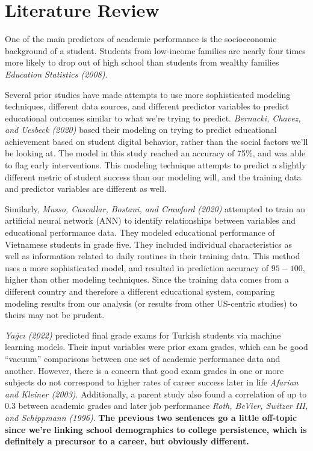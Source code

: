 \documentclass[
  man,floatsintext]{apa6}
\begin{document}
\hypertarget{literature-review}{%
\section{Literature Review}\label{literature-review}}

One of the main predictors of academic performance is the socioeconomic background of a student. Students from low-income families are nearly four times more likely to drop out of high school than students from wealthy families \emph{Education Statistics (2008)}.

Several prior studies have made attempts to use more sophisticated modeling techniques, different data sources, and different predictor variables to predict educational outcomes similar to what we're trying to predict. \emph{Bernacki, Chavez, and Uesbeck (2020)} based their modeling on trying to predict educational achievement based on student digital behavior, rather than the social factors we'll be looking at. The model in this study reached an accuracy of 75\%, and was able to flag early interventions. This modeling technique attempts to predict a slightly different metric of student success than our modeling will, and the training data and predictor variables are different as well.

Similarly, \emph{Musso, Cascallar, Bostani, and Crawford (2020)} attempted to train an artificial neural network (ANN) to identify relationships between variables and educational performance data. They modeled educational performance of Vietnamese students in grade five. They included individual characteristics as well as information related to daily routines in their training data. This method uses a more sophisticated model, and resulted in prediction accuracy of \(95-100%
\), higher than other modeling techniques. Since the training data comes from a different country and therefore a different educational system, comparing modeling results from our analysis (or results from other US-centric studies) to theirs may not be prudent.

\emph{Yağcı (2022)} predicted final grade exams for Turkish students via machine learning models. Their input variables were prior exam grades, which can be good ``vacuum'' comparisons between one set of academic performance data and another. However, there is a concern that good exam grades in one or more subjects do not correspond to higher rates of career success later in life \emph{Afarian and Kleiner (2003)}. Additionally, a parent study also found a correlation of up to 0.3 between academic grades and later job performance \emph{Roth, BeVier, Switzer III, and Schippmann (1996)}. \textbf{The previous two sentences go a little off-topic since we're linking school demographics to college persistence, which is definitely a precursor to a career, but obviously different.}
\end{document}
